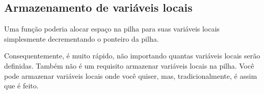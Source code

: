 \subsection{Armazenamento de variáveis locais}

Uma função poderia alocar espaço na pilha para suas variáveis locais simplesmente decrementando o ponteiro da pilha.


Consequentemente, é muito rápido, não importando quantas variáveis locais serão definidas.
Também não é um requisito armazenar variáveis locais na pilha.
Você pode armazenar variáveis locais onde você quiser, mas, tradicionalmente, é assim que é feito.

